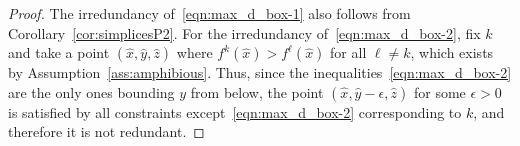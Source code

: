 \documentclass[smallextended]{svjour3}
\begin{document}
\begin{proof}
The irredundancy of~\eqref{eqn:max_d_box-1} also follows from Corollary~\ref{cor:simplicesP2}. For the irredundancy of~\eqref{eqn:max_d_box-2}, fix $k$ and take a point $(\hat{x}, \hat{y}, \hat{z})$ where $f^k(\hat{x}) > f^\ell(\hat{x})$ for all $\ell \neq k$, which exists by Assumption~\ref{ass:amphibious}. Thus, since the inequalities~\eqref{eqn:max_d_box-2} are the only ones bounding $y$ from below, the point $(\hat{x}, \hat{y} - \epsilon, \hat{z})$ for some $\epsilon > 0$ is satisfied by all constraints except~\eqref{eqn:max_d_box-2} corresponding to $k$, and therefore it is not redundant.

\end{proof}
\end{document}
